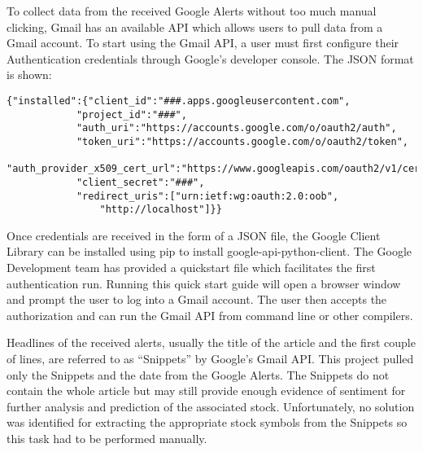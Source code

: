 \documentclass[sigconf]{acmart}
\begin{document}
To collect data from the received Google Alerts without too much manual clicking, Gmail has an available API which allows users to pull data from a Gmail account. To start using the Gmail API, a user must first configure their Authentication credentials through Google's developer console. The JSON format is shown:
\begin{mdframed}[style=default]
\begin{lstlisting}
{"installed":{"client_id":"###.apps.googleusercontent.com",
			"project_id":"###",
			"auth_uri":"https://accounts.google.com/o/oauth2/auth",
			"token_uri":"https://accounts.google.com/o/oauth2/token",
			"auth_provider_x509_cert_url":"https://www.googleapis.com/oauth2/v1/certs",
			"client_secret":"###",
			"redirect_uris":["urn:ietf:wg:oauth:2.0:oob",
				"http://localhost"]}}
\end{lstlisting}
\end{mdframed}
Once credentials are received in the form of a JSON file, the Google Client Library can be installed using pip to install google-api-python-client. The Google Development team has provided a quickstart file which facilitates the first authentication run. Running this quick start guide will open a browser window and prompt the user to log into a Gmail account. The user then accepts the authorization and can run the Gmail API from command line or other compilers. 

 Headlines of the received alerts, usually the title of the article and the first couple of lines, are referred to as ``Snippets'' by Google's Gmail API. This project pulled only the Snippets and the date from the Google Alerts. The Snippets do not contain the whole article but may still provide enough evidence of sentiment for further analysis and prediction of the associated stock. Unfortunately, no solution was identified for extracting the appropriate stock symbols from the Snippets so this task had to be performed manually. 
\end{document}
